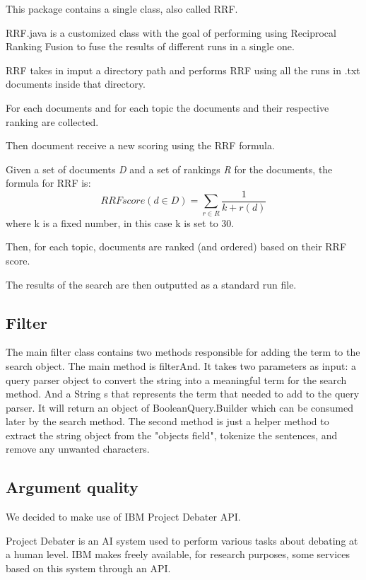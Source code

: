       This package contains a single class, also called RRF.
        
        RRF.java is a customized class with the goal of performing using Reciprocal Ranking Fusion to fuse the results of different runs in a single one.
        
        RRF takes in imput a directory path and performs RRF using all the runs in .txt documents inside that directory.
        
        For each documents and for each topic the documents and their respective ranking are collected.
        
        Then document receive a new scoring using the RRF formula.
        
        Given a set of documents \textit{D} and a set of rankings \textit{R} for the documents, the formula for RRF is:
        $$RRFscore(d \in D)=\sum_{r \in R}^{}\frac{1}{k+r(d)}$$
        where k is a fixed number, in this case k is set to 30.
        
        Then, for each topic, documents are ranked (and ordered) based on their RRF score.
        
        The results of the search are then outputted as a standard run file.
\subsection{Filter}
 
    The main filter class contains two methods responsible for adding the term to the search object. The main method is filterAnd. It takes two parameters as input: a query parser object to convert the string into a meaningful term for the search method. And a String s that represents the term that needed to add to the query parser. It will return an object of BooleanQuery.Builder which can be consumed later by the search method. The second method is just a helper method to extract the string object from the "objects field", tokenize the sentences, and remove any unwanted characters.

\subsection{Argument quality}
  \label{subsec:Argument quality}
  We decided to make use of IBM Project Debater API.
  
      Project Debater is an AI system used to perform various tasks about debating at a human level. IBM makes freely available, for research purposes, some services based on this system through an API. \citep{ProjectDebaterAPI}
      
